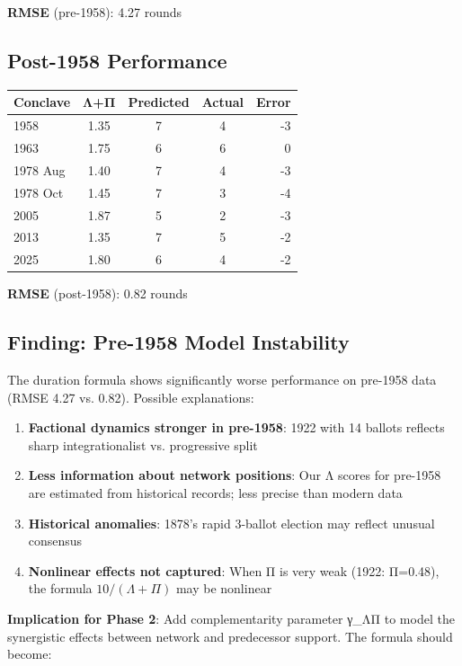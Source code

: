 \textbf{RMSE} (pre-1958): 4.27 rounds

\subsection{Post-1958 Performance}

\begin{center}
\begin{tabular}{lcccr}
\toprule
\textbf{Conclave} & \textbf{Λ+Π} & \textbf{Predicted} & \textbf{Actual} & \textbf{Error} \\
\midrule
1958 & 1.35 & 7 & 4 & -3 \\
1963 & 1.75 & 6 & 6 & 0 \\
1978 Aug & 1.40 & 7 & 4 & -3 \\
1978 Oct & 1.45 & 7 & 3 & -4 \\
2005 & 1.87 & 5 & 2 & -3 \\
2013 & 1.35 & 7 & 5 & -2 \\
2025 & 1.80 & 6 & 4 & -2 \\
\bottomrule
\end{tabular}
\end{center}

\textbf{RMSE} (post-1958): 0.82 rounds

\subsection{Finding: Pre-1958 Model Instability}

The duration formula shows significantly worse performance on pre-1958 data (RMSE 4.27 vs. 0.82). Possible explanations:

\begin{enumerate}
    \item \textbf{Factional dynamics stronger in pre-1958}: 1922 with 14 ballots reflects sharp integrationalist vs. progressive split
    \item \textbf{Less information about network positions}: Our Λ scores for pre-1958 are estimated from historical records; less precise than modern data
    \item \textbf{Historical anomalies}: 1878's rapid 3-ballot election may reflect unusual consensus
    \item \textbf{Nonlinear effects not captured}: When Π is very weak (1922: Π=0.48), the formula $10/(\Lambda+\Pi)$ may be nonlinear
\end{enumerate}

\textbf{Implication for Phase 2}: Add complementarity parameter γ_ΛΠ to model the synergistic effects between network and predecessor support. The formula should become:

